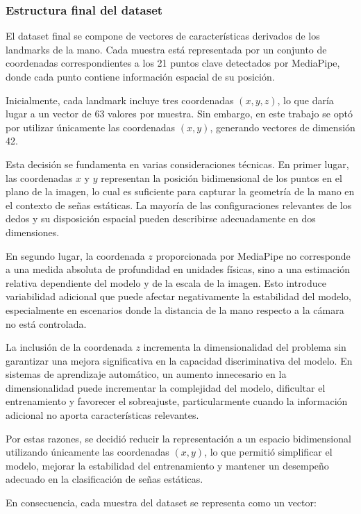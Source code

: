 	\subsubsection{Estructura final del dataset}
	
	El dataset final se compone de vectores de características derivados de los landmarks de la mano. Cada muestra está representada por un conjunto de coordenadas correspondientes a los 21 puntos clave detectados por MediaPipe, donde cada punto contiene información espacial de su posición.
	
	Inicialmente, cada landmark incluye tres coordenadas $(x, y, z)$, lo que daría lugar a un vector de 63 valores por muestra. Sin embargo, en este trabajo se optó por utilizar únicamente las coordenadas $(x, y)$, generando vectores de dimensión 42.
	
	Esta decisión se fundamenta en varias consideraciones técnicas. En primer lugar, las coordenadas $x$ y $y$ representan la posición bidimensional de los puntos en el plano de la imagen, lo cual es suficiente para capturar la geometría de la mano en el contexto de señas estáticas. La mayoría de las configuraciones relevantes de los dedos y su disposición espacial pueden describirse adecuadamente en dos dimensiones.
	
	En segundo lugar, la coordenada $z$ proporcionada por MediaPipe no corresponde a una medida absoluta de profundidad en unidades físicas, sino a una estimación relativa dependiente del modelo y de la escala de la imagen. Esto introduce variabilidad adicional que puede afectar negativamente la estabilidad del modelo, especialmente en escenarios donde la distancia de la mano respecto a la cámara no está controlada.
	
	La inclusión de la coordenada $z$ incrementa la dimensionalidad del problema sin garantizar una mejora significativa en la capacidad discriminativa del modelo. En sistemas de aprendizaje automático, un aumento innecesario en la dimensionalidad puede incrementar la complejidad del modelo, dificultar el entrenamiento y favorecer el sobreajuste, particularmente cuando la información adicional no aporta características relevantes.
	
	Por estas razones, se decidió reducir la representación a un espacio bidimensional utilizando únicamente las coordenadas $(x, y)$, lo que permitió simplificar el modelo, mejorar la estabilidad del entrenamiento y mantener un desempeño adecuado en la clasificación de señas estáticas.
	
	En consecuencia, cada muestra del dataset se representa como un vector:
	
